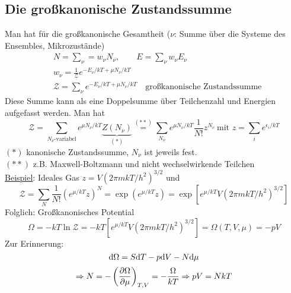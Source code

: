 \subsection{Die großkanonische Zustandssumme}
Man hat für die großkanonische Gesamtheit ($\nu$: Summe über die Systeme des Ensembles, Mikrozustände)
\begin{equation}
    \begin{split}
    & N = \sum_\nu = w_\nu N_\nu, \qquad E = \sum_\nu w_\nu E_\nu \\
    & w_\nu = \frac{1}{\mathcal{Z}} e^{- E_\nu / kT + \mu N_\nu / kT} \\
    & \mathcal{Z} = \sum_\nu e^{-E_\nu / k T + \mu N_\nu / kT} \quad \text{großkanonische Zustandssumme}
    \end{split}
\end{equation}
Diese Summe kann als eine Doppelsumme über Teilchenzahl und Energien aufgefasst werden. Man hat
\begin{equation}
    \mathcal{Z} = \sum_{N_\nu \text{-variabel}} e^{\mu N_\nu / k T} \underbrace{Z(N_\nu)}_{(*)} \overset{(**)}{=} \sum_{N_\nu} e^{\mu N_\nu / kT} \frac{1}{N!} z^{N_\nu} \ \text{mit } z = \sum_i e^{\epsilon_i / kT}
\end{equation}
$(*)$ kanonische Zustandssumme, $N_\nu$ ist jeweils fest. \\
$(**)$ z.B. Maxwell-Boltzmann und nicht wechselwirkende Teilchen\\
\underline{Beispiel}: Ideales Gas $z = V (2 \pi m k T / h^2)^{3/2}$ und 
\begin{equation}
    \label{eq:grosskan_summe:idealesGas}
    \mathcal{Z} = \sum_N \frac{1}{N!} \left( e^{\mu / kT} z \right)^N = \exp \left( e^{\mu/kT} z \right) = \exp \left[ e^{\mu/kT} V \left( 2 \pi m k T/ h^2 \right)^{3/2} \right]
\end{equation}
Folglich: Großkanonisches Potential
\begin{equation}
    \label{eq:grosskan_pot:idealesGas}
    \Omega = - k T \ln \mathcal{Z} = - k T \left[ e^{\mu/kT} V \left( 2 \pi m k T/ h^2 \right)^{3/2} \right] = \Omega(T, V, \mu) = - p V
\end{equation}
Zur Erinnerung:
\begin{equation}
    \mathrm{d} \Omega = S \mathrm{d} T - p \mathrm{d} V - N \mathrm{d} \mu
\end{equation}
\begin{equation}
    \Rightarrow N = - \left( \frac{\partial \Omega}{\partial \mu} \right)_{T, V} = - \frac{\Omega}{k T} \Rightarrow p V = N k T
\end{equation}

